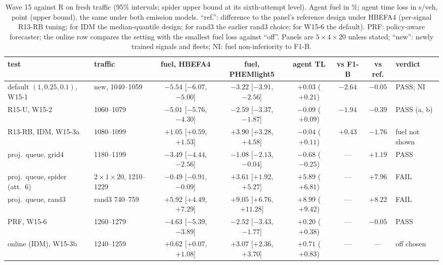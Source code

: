 \begin{table}[t]\centering\scriptsize\setlength{\tabcolsep}{2.5pt}
\caption{Wave 15 against R on fresh traffic (95\% intervals; spider upper bound at its sixth-attempt level). Agent fuel in \%; agent time
loss in s/veh, point (upper bound), the same under both emission models. ``ref.'': difference to the panel's reference design under
HBEFA4 (per-signal R13-RB tuning; for IDM the median-quantile design; for rand3 the earlier rand3 choice; for W15-6 the default). PRF: policy-aware forecaster; the online row compares the setting with the smallest fuel loss against ``off''. Panels are $5\times4\times20$ unless stated; ``new'': newly trained signals and fleets; NI:
fuel non-inferiority to F1-B.}\label{tab:w15}
\begin{tabular}{@{}llcccccl@{}}\toprule
test & traffic & fuel, HBEFA4 & fuel, PHEMlight5 & agent TL & vs F1-B & vs ref. & verdict\\\midrule
default $(1,0.25,0.1)$, W15-1 & new, 1040--1059 & $-5.54$ [$-6.07$, $-5.00$] & $-3.22$ [$-3.91$, $-2.56$] & $+0.03$ ($+0.21$) & $-2.64$ & $-0.05$ & PASS; NI\\
R15-U, W15-2 & 1060--1079 & $-5.01$ [$-5.76$, $-4.30$] & $-2.59$ [$-3.37$, $-1.87$] & $-0.09$ ($+0.09$) & $-1.94$ & $-0.39$ & PASS (a, b)\\
R13-RB, IDM, W15-3a & 1080--1099 & $+1.05$ [$+0.59$, $+1.53$] & $+3.90$ [$+3.28$, $+4.58$] & $-0.04$ ($+0.11$) & $+0.43$ & $-1.76$ & fuel not shown\\
proj.\ queue, grid4 & 1180--1199 & $-3.49$ [$-4.44$, $-2.56$] & $-1.08$ [$-2.13$, $-0.04$] & $-0.68$ ($-0.25$) & --- & $+1.19$ & PASS\\
proj.\ queue, spider (att.\ 6) & $2\times1\times20$, 1210--1229 & $-0.49$ [$-0.91$, $-0.09$] & $+3.61$ [$+1.92$, $+5.27$] & $+5.89$ ($+6.81$) & --- & $+7.96$ & FAIL\\
proj.\ queue, rand3 & rand3 740--759 & $+5.92$ [$+4.49$, $+7.29$] & $+9.05$ [$+6.76$, $+11.28$] & $+8.99$ ($+9.42$) & --- & $+8.22$ & FAIL\\
PRF, W15-6 & 1260--1279 & $-4.63$ [$-5.39$, $-3.89$] & $-2.52$ [$-3.43$, $-1.77$] & $+0.20$ ($+0.38$) & --- & $-0.05$ & PASS\\
online (IDM), W15-3b & 1240--1259 & $+0.62$ [$+0.07$, $+1.08$] & $+3.07$ [$+2.36$, $+3.70$] & $+0.71$ ($+0.83$) & --- & --- & off chosen\\\bottomrule
\end{tabular}\end{table}

